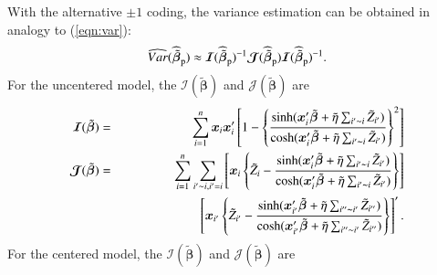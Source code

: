 \documentclass[authoryear,review, 12pt]{elsarticle}
\begin{document}
With the alternative $\pm 1$ coding, the variance estimation can be obtained in analogy to (\ref{eqn:var}):
\begin{eqnarray}
\widehat{Var}(\widehat{\tilde{\bm{\beta}}}_{\rm p})\approx\bm{\mathcal{I}}(\widehat{\tilde{\bm{\beta}}}_{\rm p})^{-1}\bm{\mathcal{J}}(\widehat{\tilde{\bm{\beta}}}_{\rm p})\bm{\mathcal{I}}(\widehat{\tilde{\bm{\beta}}}_{\rm p})^{-1}.
\label{eqn:varCenter}
\end{eqnarray}  
For the uncentered model, the $\bm{\mathcal{I}}(\tilde{\bm{\beta}})$ and $\bm{\mathcal{J}}(\tilde{\bm{\beta}})$ are
\begin{eqnarray*}
\bm{\mathcal{I}}(\tilde{\bm{\beta}})&=&\sum_{i=1}^n \bm{x}_i\bm{x}_i' \left[1-\left\{\frac{ \sinh({\bm{x}_i'\tilde{\bm{\beta}}+\tilde{\eta}\sum_{i' \thicksim i}\tilde{Z}_{i'}})}{\cosh(\bm{x}_i'\tilde{\bm{\beta}}+\tilde{\eta}\sum_{i' \thicksim i}\tilde{Z}_{i'})}\right\}^2\right]\\
\bm{\mathcal{J}}(\tilde{\bm{\beta}})&=&\sum_{i=1}^n \sum_{i'\thicksim i, i'=i}\left[\bm{x}_i\left\{\tilde{Z}_i-\frac{\sinh({\bm{x}_i'\tilde{\bm{\beta}}+\tilde{\eta}\sum_{i' \thicksim i}\tilde{Z}_{i'}})}{\cosh(\bm{x}_i'\tilde{\bm{\beta}}+\tilde{\eta}\sum_{i' \thicksim i}\tilde{Z}_{i'})}\right\}\right]\\
&&\quad\quad\quad\quad\quad\quad\left[\bm{x}_{i'}\left\{\tilde{Z}_{i'}-\frac{\sinh({\bm{x}_{i'}'\tilde{\bm{\beta}}+\tilde{\eta}\sum_{i'' \thicksim i'}\tilde{Z}_{i''}})}{\cosh(\bm{x}_{i'}'\tilde{\bm{\beta}}+\tilde{\eta}\sum_{i'' \thicksim i'}\tilde{Z}_{i''})}\right\}\right]'.
\end{eqnarray*}
For the centered model, the $\bm{\mathcal{I}}(\tilde{\bm{\beta}})$ and $\bm{\mathcal{J}}(\tilde{\bm{\beta}})$ are
\end{document}
